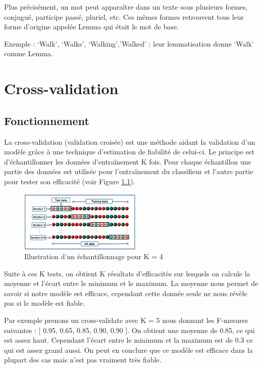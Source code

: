 \documentclass[a4paper]{report}
\begin{document}
        Plus précisément, un mot peut apparaître dans un texte sous plusieurs formes, conjugué, participe passé, pluriel, etc. Ces mêmes formes retrouvent tous leur forme d’origine appelée Lemma qui était le mot de base.

        Exemple : ‘Walk’, ‘Walks’, ‘Walking’,’Walked’ : leur lemmatisation donne ‘Walk’ comme Lemma.

    \chapter{Cross-validation}

        \section{Fonctionnement}

            La cross-validation (validation croisée) est une méthode aidant la validation d’un modèle grâce à une technique d’estimation de fiabilité de celui-ci.
            Le principe est d’échantillonner les données d'entraînement K fois. Pour chaque échantillon une partie des données est utilisée pour l'entraînement du classifieur et l’autre partie pour tester son efficacité (voir Figure \ref{fig:1}).

            \begin{figure}
                \centering
                \includegraphics[width=.6\linewidth]{cross_validation.png}
                \caption{Illustration d’un échantillonnage pour K = 4}
                \label{fig:1}
            \end{figure}

            Suite à ces K tests, on obtient K résultats d’efficacités sur lesquels on calcule la moyenne et l’écart entre le minimum et le maximum.
            La moyenne nous permet de savoir si notre modèle est efficace, cependant cette donnée seule ne nous révèle pas si le modèle est fiable.

            Par exemple prenons un cross-validate avec K = 5 nous donnant les F-mesures suivantes : [ 0.95, 0.65, 0.85, 0.90, 0.90 ].
            On obtient une moyenne de 0.85, ce qui est assez haut. Cependant l’écart entre le minimum et la maximum est de 0.3 ce qui est assez grand aussi. On peut en conclure que ce modèle est efficace dans la plupart des cas mais n’est pas vraiment très fiable.
\end{document}
